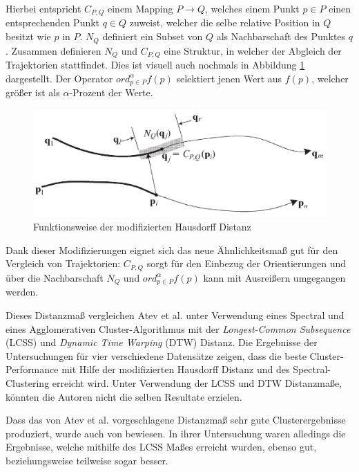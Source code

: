 Hierbei entspricht $C_{P,Q}$ einem Mapping $P \rightarrow Q$, welches einem Punkt $p \in P$ einen entsprechenden
Punkt $q \in Q$ zuweist, welcher die selbe relative Position in $Q$ besitzt wie $p$ in $P$.
$N_Q$ definiert ein Subset von $Q$ als Nachbarschaft des Punktes $q$. Zusammen definieren $N_Q$ und $C_{P,Q}$ eine
Struktur, in welcher der Abgleich der Trajektorien stattfindet. Dies ist visuell auch nochmals in Abbildung
\ref{fig:relw_atev_modh} dargestellt. Der Operator $ord_{p \in P}^{\alpha} f(p)$ selektiert jenen Wert aus $f(p)$, welcher
größer ist als $\alpha$-Prozent der Werte.

\begin{figure}[H]
    \centering
    \includegraphics[width=0.6\linewidth]{../resources/img/RelatedWork/Atev_modHausdorff}
    \caption[Funktionsweise der modifizierten Hausdorff Distanz]{Funktionsweise der modifizierten Hausdorff Distanz \cite[]{Atev2010}}
    \label{fig:relw_atev_modh}
\end{figure}

Dank dieser Modifizierungen eignet sich das neue Ähnlichkeitsmaß gut für den Vergleich von Trajektorien:
$C_{P,Q}$ sorgt für den Einbezug der Orientierungen und über die Nachbarschaft $N_Q$ und $ord_{p \in P}^{\alpha} f(p)$
kann mit Ausreißern umgegangen werden.

Dieses Distanzmaß vergleichen Atev et al. unter Verwendung eines Spectral und eines Agglomerativen
Cluster-Algorithmus mit der \textit{Longest-Common Subsequence} (LCSS) und \textit{Dynamic Time Warping} (DTW) Distanz.
Die Ergebnisse der Untersuchungen für vier verschiedene Datensätze zeigen, dass die beste Cluster-Performance
mit Hilfe der modifizierten Hausdorff Distanz und des Spectral-Clustering erreicht wird.
Unter Verwendung der LCSS und DTW Distanzmaße, könnten die Autoren nicht die selben Resultate erzielen.

Dass das von Atev et al. vorgeschlagene Distanzmaß sehr gute Clusterergebnisse produziert, wurde auch von \cite{Morris2009}
bewiesen. In ihrer Untersuchung waren alledings die Ergebnisse, welche mithilfe des LCSS Maßes erreicht wurden,
ebenso gut, beziehungsweise teilweise sogar besser.

